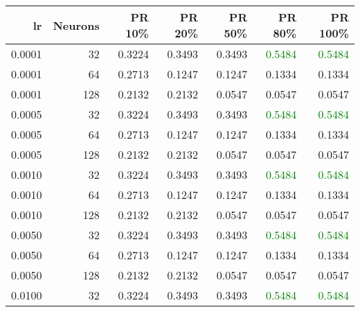 \begin{tabular}{rrrrrrr}
\toprule
lr & Neurons & PR 10\% & PR 20\% & PR 50\% & PR 80\% & PR 100\% \\
\midrule
0.0001 & 32 & \textcolor{blu} {0.3224} & \textcolor{blu} {0.3493} & \textcolor{blu} {0.3493} & \textcolor{green} {0.5484} & \textcolor{green} {0.5484} \\
0.0001 & 64 & \textcolor{blu} {0.2713} & \textcolor{blu} {0.1247} & \textcolor{blu} {0.1247} & \textcolor{blu} {0.1334} & \textcolor{blu} {0.1334} \\
0.0001 & 128 & \textcolor{blu} {0.2132} & \textcolor{blu} {0.2132} & \textcolor{blu} {0.0547} & \textcolor{blu} {0.0547} & \textcolor{blu} {0.0547} \\
0.0005 & 32 & \textcolor{blu} {0.3224} & \textcolor{blu} {0.3493} & \textcolor{blu} {0.3493} & \textcolor{green} {0.5484} & \textcolor{green} {0.5484} \\
0.0005 & 64 & \textcolor{blu} {0.2713} & \textcolor{blu} {0.1247} & \textcolor{blu} {0.1247} & \textcolor{blu} {0.1334} & \textcolor{blu} {0.1334} \\
0.0005 & 128 & \textcolor{blu} {0.2132} & \textcolor{blu} {0.2132} & \textcolor{blu} {0.0547} & \textcolor{blu} {0.0547} & \textcolor{blu} {0.0547} \\
0.0010 & 32 & \textcolor{blu} {0.3224} & \textcolor{blu} {0.3493} & \textcolor{blu} {0.3493} & \textcolor{green} {0.5484} & \textcolor{green} {0.5484} \\
0.0010 & 64 & \textcolor{blu} {0.2713} & \textcolor{blu} {0.1247} & \textcolor{blu} {0.1247} & \textcolor{blu} {0.1334} & \textcolor{blu} {0.1334} \\
0.0010 & 128 & \textcolor{blu} {0.2132} & \textcolor{blu} {0.2132} & \textcolor{blu} {0.0547} & \textcolor{blu} {0.0547} & \textcolor{blu} {0.0547} \\
0.0050 & 32 & \textcolor{blu} {0.3224} & \textcolor{blu} {0.3493} & \textcolor{blu} {0.3493} & \textcolor{green} {0.5484} & \textcolor{green} {0.5484} \\
0.0050 & 64 & \textcolor{blu} {0.2713} & \textcolor{blu} {0.1247} & \textcolor{blu} {0.1247} & \textcolor{blu} {0.1334} & \textcolor{blu} {0.1334} \\
0.0050 & 128 & \textcolor{blu} {0.2132} & \textcolor{blu} {0.2132} & \textcolor{blu} {0.0547} & \textcolor{blu} {0.0547} & \textcolor{blu} {0.0547} \\
0.0100 & 32 & \textcolor{blu} {0.3224} & \textcolor{blu} {0.3493} & \textcolor{blu} {0.3493} & \textcolor{green} {0.5484} & \textcolor{green} {0.5484} \\

\end{tabular}
